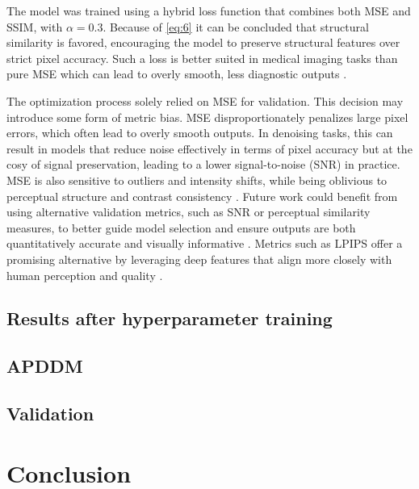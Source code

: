 \documentclass[twocolumn]{article}
\begin{document}
The model was trained using a hybrid loss function that combines both MSE and SSIM, with  $\alpha=0.3$. 
Because of \ref{eq:6} it can be concluded that structural similarity is favored, encouraging the model to preserve structural features over strict pixel accuracy. 
Such a loss is better suited in medical imaging tasks than pure MSE which can lead to overly smooth, less diagnostic outputs \cite{Dastmalchi}. 

The optimization process solely relied on MSE for validation. This decision may introduce some form of metric bias. 
MSE disproportionately penalizes large pixel errors, which often lead to overly smooth outputs. 
In denoising tasks, this can result in models that reduce noise effectively in terms of pixel accuracy but at the cosy of signal preservation, leading to a lower signal-to-noise (SNR) in practice. 
MSE is also sensitive to outliers and intensity shifts, while being oblivious to perceptual structure and contrast consistency \cite{1284395}. 
Future work could benefit from using alternative validation metrics, such as SNR or perceptual similarity measures, to better guide model selection and ensure outputs are both quantitatively accurate and visually informative \cite{chavhan2009t2star}. 
Metrics such as LPIPS offer a promising alternative by leveraging deep features that align more closely with human perception and quality \cite{zhang2018unreasonableeffectivenessdeepfeatures}.

\subsection{Results after hyperparameter training}

\subsection{APDDM}

\subsection{Validation}

\section{Conclusion}
\end{document}
